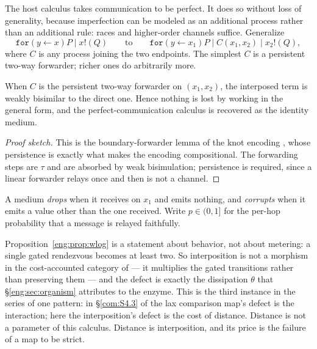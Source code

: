 The host calculus takes communication to be perfect. It does so without
loss of generality, because imperfection can be modeled as an additional
process rather than an additional rule: races and higher-order channels
suffice. Generalize
\[
  \texttt{for}(y \leftarrow x)P \mid x!(Q)
  \qquad\text{to}\qquad
  \texttt{for}(y \leftarrow x_1)P \mid C(x_1,x_2) \mid x_2!(Q),
\]
where $C$ is any process joining the two endpoints. The simplest $C$ is a
persistent two-way forwarder; richer ones do arbitrarily more.

\begin{proposition}\label{eng:prop:wlog}
When $C$ is the persistent two-way forwarder on $(x_1,x_2)$, the interposed
term is weakly bisimilar to the direct one. Hence nothing is lost by
working in the general form, and the perfect-communication calculus is
recovered as the identity medium.
\end{proposition}

\begin{proof}[Proof sketch]
This is the boundary-forwarder lemma of the knot encoding
\cite{KnotsNote}, whose persistence is exactly what makes the encoding
compositional. The forwarding steps are $\tau$ and are absorbed by weak
bisimulation; persistence is required, since a linear forwarder relays once
and then is not a channel.
\end{proof}

\begin{definition}\label{eng:loss-corruption}
A medium \emph{drops} when it receives on $x_1$ and emits nothing, and
\emph{corrupts} when it emits a value other than the one received. Write
$p \in (0,1]$ for the per-hop probability that a message is relayed
faithfully.
\end{definition}

\begin{remark}
\label{eng:rem:notmorphism}
Proposition~\ref{eng:prop:wlog} is a statement about behavior, not about
metering: a single gated rendezvous becomes at least two. So interposition
is not a morphism in the cost-accounted category of \cite{CE} --- it
multiplies the gated transitions rather than preserving them --- and the
defect is exactly the dissipation $\theta$ that \S\ref{eng:sec:organism}
attributes to the enzyme. This is the third instance in the series of one
pattern: in \S\ref{com:S4.3} of \chComp the lax comparison map's defect is the
interaction; here the interposition's defect is the cost of distance.
Distance is not a parameter of this calculus. Distance is interposition,
and its price is the failure of a map to be strict.
\end{remark}

